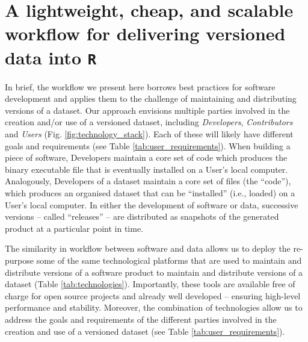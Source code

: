 \documentclass[a4paper,num-refs]{assets/oup-contemporary}
\begin{document}
\section{A lightweight, cheap, and scalable workflow for delivering versioned data into \texttt{R}}

In brief, the workflow we present here borrows best practices for software development \cite{Perez-Riverol-2016} and applies them to the challenge of maintaining and distributing versions of a dataset. Our approach envisions multiple parties involved in the creation and/or use of a versioned dataset, including \emph{Developers}, \emph{Contributors} and \emph{Users} (Fig. \ref{fig:technology_stack}). Each of these will likely have different goals and requirements (see Table \ref{tab:user_requirements}). When building a piece of software, Developers maintain a core set of code which produces the binary executable file that is eventually installed on a User's local computer. Analogously, Developers of a dataset maintain a core set of files (the ``code''), which produces an organised dataset that can be ``installed'' (i.e., loaded) on a User's local computer. In either the development of software or data, successive versions -- called ``releases'' -- are distributed as snapshots of the generated product at a particular point in time. 

The similarity in workflow between software and data allows us to deploy the re-purpose some of the same technological platforms that are used to maintain and distribute versions of a software product to maintain and distribute versions of a dataset (Table \ref{tab:technologies}). Importantly, these tools are available free of charge for open source projects and already well developed -- ensuring high-level performance and stability. Moreover, the combination of technologies allow us to address the goals and requirements of the different parties involved in the creation and use of a versioned dataset (see Table \ref{tab:user_requirements}). 
\end{document}
